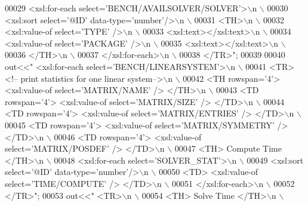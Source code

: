 \begin{DoxyCode}
{00029 \textcolor{stringliteral}{          <xsl:for-each select='BENCH/AVAILSOLVER/SOLVER'>\(\backslash\)n \(\backslash\)}
00030 \textcolor{stringliteral}{            <xsl:sort select='@ID' data-type='number'/>\(\backslash\)n \(\backslash\)}
00031 \textcolor{stringliteral}{            <TH>\(\backslash\)n \(\backslash\)}
00032 \textcolor{stringliteral}{              <xsl:value-of select='TYPE' />\(\backslash\)n \(\backslash\)}
00033 \textcolor{stringliteral}{              <xsl:text></xsl:text>\(\backslash\)n \(\backslash\)}
00034 \textcolor{stringliteral}{              <xsl:value-of select='PACKAGE' />\(\backslash\)n \(\backslash\)}
00035 \textcolor{stringliteral}{              <xsl:text></xsl:text>\(\backslash\)n \(\backslash\)}
00036 \textcolor{stringliteral}{            </TH>\(\backslash\)n \(\backslash\)}
00037 \textcolor{stringliteral}{          </xsl:for-each>\(\backslash\)n \(\backslash\)}
00038 \textcolor{stringliteral}{        </TR>"};
00039         
00040   out<<\textcolor{stringliteral}{"  <xsl:for-each select='BENCH/LINEARSYSTEM'>\(\backslash\)n \(\backslash\)}
00041 \textcolor{stringliteral}{          <TR> <!-- print statistics for one linear system-->\(\backslash\)n \(\backslash\)}
00042 \textcolor{stringliteral}{            <TH rowspan='4'> <xsl:value-of select='MATRIX/NAME' /> </TH>\(\backslash\)n \(\backslash\)}
00043 \textcolor{stringliteral}{            <TD rowspan='4'> <xsl:value-of select='MATRIX/SIZE' /> </TD>\(\backslash\)n \(\backslash\)}
00044 \textcolor{stringliteral}{            <TD rowspan='4'> <xsl:value-of select='MATRIX/ENTRIES' /> </TD>\(\backslash\)n \(\backslash\)}
00045 \textcolor{stringliteral}{            <TD rowspan='4'> <xsl:value-of select='MATRIX/SYMMETRY' /> </TD>\(\backslash\)n \(\backslash\)}
00046 \textcolor{stringliteral}{            <TD rowspan='4'> <xsl:value-of select='MATRIX/POSDEF' /> </TD>\(\backslash\)n \(\backslash\)}
00047 \textcolor{stringliteral}{            <TH> Compute Time </TH>\(\backslash\)n \(\backslash\)}
00048 \textcolor{stringliteral}{            <xsl:for-each select='SOLVER\_STAT'>\(\backslash\)n \(\backslash\)}
00049 \textcolor{stringliteral}{              <xsl:sort select='@ID' data-type='number'/>\(\backslash\)n \(\backslash\)}
00050 \textcolor{stringliteral}{              <TD> <xsl:value-of select='TIME/COMPUTE' /> </TD>\(\backslash\)n \(\backslash\)}
00051 \textcolor{stringliteral}{            </xsl:for-each>\(\backslash\)n \(\backslash\)}
00052 \textcolor{stringliteral}{          </TR>"};
00053   out<<\textcolor{stringliteral}{"  <TR>\(\backslash\)n \(\backslash\)}
00054 \textcolor{stringliteral}{            <TH> Solve Time </TH>\(\backslash\)n \(\backslash\)}
}
\end{DoxyCode}
